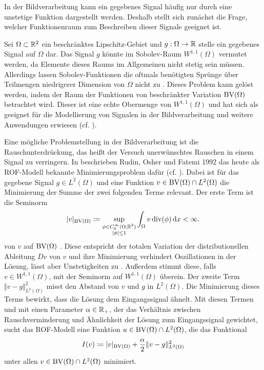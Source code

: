 In der Bildverarbeitung kann ein gegebenes Signal häufig nur durch eine
unstetige Funktion dargestellt werden. Deshalb stellt sich zunächst die Frage,
welcher Funktionenraum zum Beschreiben dieser Signale geeignet ist.

Sei $\Omega\subset\mathbb{R}^2$ ein beschränktes Lipschitz-Gebiet und $g:\Omega\to
\mathbb{R}$ stelle ein gegebenes Signal auf $\Omega$ dar. Das Signal $g$ könnte im
Sobolev-Raum $W^{1,1}(\Omega)$ vermutet werden, da Elemente dieses Raums im
Allgemeinen nicht stetig sein müssen. 
Allerdings lassen Sobolev-Funktionen die oftmals benötigten Sprünge über
Teilmengen niedrigerer Dimension von $\Omega$ nicht zu
\cite[297]{Bar15}.
Dieses Problem kann gelöst werden, indem der Raum der Funktionen von
beschränkter Variation $\textup{BV}(\Omega)$ betrachtet wird. Dieser ist eine echte
Obermenge von $W^{1,1}(\Omega)$ und hat sich als geeignet für die Modellierung 
von Signalen in der Bildverarbeitung und weitere Anwendungen erwiesen (cf.
\cites[393]{ABM14}[42]{AK06}[297]{Bar15}[S. 1 f.]{Bra98}).

Eine mögliche Problemstellung in der Bildverarbeitung ist die 
Rauschunterdrü\-ckung, das heißt der Versuch unerwünschtes Rauschen in einem
Signal zu verringern.
In \cite{ROF92} beschrieben Rudin, Osher und Fatemi 1992 das heute als
ROF-Modell bekannte Minimierungsproblem dafür (cf.
\cites[1217]{Bar15a}[132]{CP10}[S. 74 f.]{Get12}).
Dabei ist für das gegebene Signal $g\in L^2(\Omega)$ und 
eine Funktion $v\in\textup{BV}(\Omega)\cap L^2(\Omega)$ die Minimierung
der Summe der zwei folgenden Terme relevant.
Der erste Term ist die
Seminorm
\begin{align*}
  \label{eq:boundedVariation}
  |v|_{\textup{BV}(\Omega)}
  \coloneqq
  \sup_{\substack{\phi\in C^\infty_0(\Omega;\mathbb{R}^2)\\
  |\phi|\leq 1}}\int_\Omega v\operatorname{div} (\phi)\,\mathrm{d}x
  <
  \infty.
\end{align*}
von $v$ auf $\textup{BV}(\Omega)$ \cite[1162]{Bar12}. Diese entspricht der
totalen Variation der distributionellen Ableitung $Dv$ von $v$ und
ihre Minimierung verhindert Oszillationen in der Lösung, lässt aber
Unstetigkeiten zu \cite[72]{Get12}.
Außerdem stimmt diese, falls $v\in W^{1,1}(\Omega)$, mit der Seminorm auf
$W^{1,1}(\Omega)$ überein. Der zweite Term 
$\Vert v-g\Vert_{L^2(\Omega)}^2$ misst den Abstand von $v$ und $g$ in
$L^2(\Omega)$. Die Minimierung dieses Terms bewirkt, dass die Lösung
dem Eingangssignal ähnelt.
Mit diesen Termen und mit einen Parameter
$\alpha\in\mathbb{R}_+$, der das Verhältnis zwischen Rauschverminderung und
Ähnlichkeit der Lösung zum Eingangssignal gewichtet, sucht das ROF-Modell
eine Funktion $u\in\textup{BV}(\Omega)\cap L^2(\Omega)$, die das Funktional
\begin{align*}
  I(v)\coloneqq |v|_{\textup{BV}(\Omega)}+\frac{\alpha}{2}\Vert
  v-g\Vert_{L^2(\Omega)}^2
\end{align*}
unter allen $v\in\textup{BV}(\Omega)\cap L^2(\Omega)$ minimiert.

